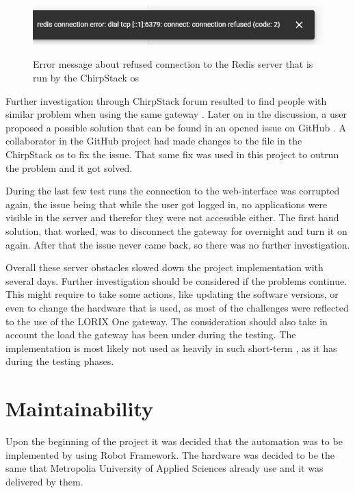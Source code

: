 \begin{figure}[ht]
  \centering
  {\includegraphics[width=\textwidth]{illustration/error_when_confirming_device_deleting.PNG}}
  \caption{Error message about refused connection to the Redis server that is run by the ChirpStack \gls{os}}
  \label{fig:error_when_confirming_device_deleting}
\end{figure}

Further investigation through ChirpStack forum resulted to find people with similar problem when using the same gateway \cite{chirpstack_forum:redis_error}.
Later on in the discussion, a user proposed a possible solution that can be found in an opened issue on GitHub \cite{github:redis_issue}.
A collaborator in the GitHub project had made changes to the  file in the ChirpStack \gls{os} to fix the issue.
That same fix was used in this project to outrun the problem and it got solved.

During the last few test runs the connection to the web-interface was corrupted again, the issue being that while the user got logged in, no applications were visible in the server and therefor they were not accessible either.
The first hand solution, that worked, was to disconnect the gateway for overnight and turn it on again.
After that the issue never came back, so there was no further investigation.

Overall these server obstacles slowed down the project implementation with several days.
Further investigation should be considered if the problems continue.
This might require to take some actions, like updating the software versions, or even to change the hardware that is used, as most of the challenges were reflected to the use of the LORIX One gateway.
The consideration should also take in account the load the gateway has been under during the testing.
The implementation is most likely not used as heavily in such short-term , as it has during the testing phases.


\section{Maintainability}
 Upon the beginning of the project it was decided that the automation was to be implemented by using Robot Framework.
 The hardware was decided to be the same that Metropolia University of Applied Sciences already use and it was delivered by them.

